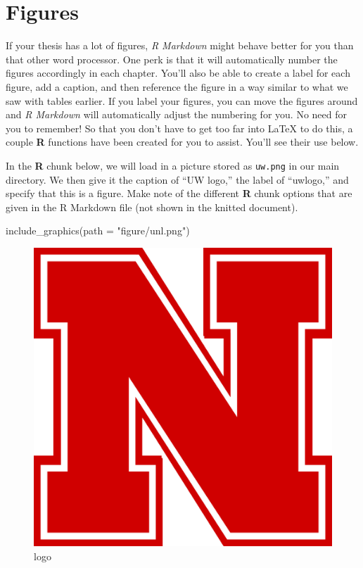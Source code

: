 \documentclass[print]{nuthesis}
\newenvironment{Shaded}{\begin{snugshade}}{\end{snugshade}}
\newcommand{\AttributeTok}[1]{\textcolor[rgb]{0.77,0.63,0.00}{#1}}
\newcommand{\FunctionTok}[1]{\textcolor[rgb]{0.00,0.00,0.00}{#1}}
\newcommand{\NormalTok}[1]{#1}
\newcommand{\StringTok}[1]{\textcolor[rgb]{0.31,0.60,0.02}{#1}}
\begin{document}
\clearpage

\hypertarget{figures}{%
\section{Figures}\label{figures}}

If your thesis has a lot of figures, \emph{R Markdown} might behave better for you than that other word processor. One perk is that it will automatically number the figures accordingly in each chapter. You'll also be able to create a label for each figure, add a caption, and then reference the figure in a way similar to what we saw with tables earlier. If you label your figures, you can move the figures around and \emph{R Markdown} will automatically adjust the numbering for you. No need for you to remember! So that you don't have to get too far into LaTeX to do this, a couple \textbf{R} functions have been created for you to assist. You'll see their use below.

In the \textbf{R} chunk below, we will load in a picture stored as \texttt{uw.png} in our main directory. We then give it the caption of ``UW logo,'' the label of ``uwlogo,'' and specify that this is a figure. Make note of the different \textbf{R} chunk options that are given in the R Markdown file (not shown in the knitted document).

\begin{Shaded}
\begin{Highlighting}[]
\FunctionTok{include\_graphics}\NormalTok{(}\AttributeTok{path =} \StringTok{"figure/unl.png"}\NormalTok{)}
\end{Highlighting}
\end{Shaded}

\begin{figure}
\includegraphics[width=\linewidth]{figure/unl} \caption{logo}\label{fig:uwlogo}
\end{figure}
\end{document}
